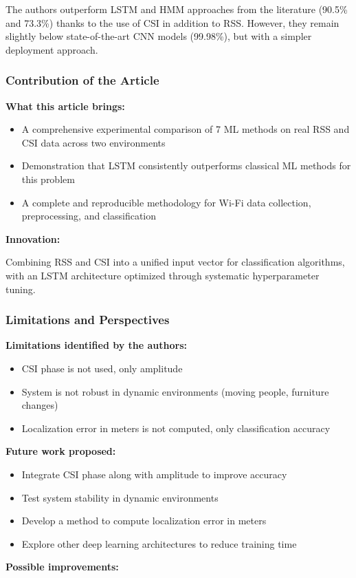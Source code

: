 \documentclass{ipgpmaster}
\begin{document}
 The authors outperform LSTM and HMM approaches from the literature (90.5\% and 73.3\%) thanks to the use of CSI in addition to RSS. However, they remain slightly below state-of-the-art CNN models (99.98\%), but with a simpler deployment approach.

\subsubsection{\textbf{Contribution of the Article}}

\textbf{What this article brings:}

\begin{itemize}
    \item A comprehensive experimental comparison of 7 ML methods on real RSS and CSI data across two environments 
    \item Demonstration that LSTM consistently outperforms classical ML methods for this problem 
    \item A complete and reproducible methodology for Wi-Fi data collection, preprocessing, and classification 
\end{itemize}
\textbf{Innovation:}

 Combining RSS and CSI into a unified input vector for classification algorithms, with an LSTM architecture optimized through systematic hyperparameter tuning.

\subsubsection{\textbf{Limitations and Perspectives}}

\textbf{Limitations identified by the authors:}

\begin{itemize}
    \item CSI phase is not used, only amplitude 
    \item System is not robust in dynamic environments (moving people, furniture changes) 
    \item Localization error in meters is not computed, only classification accuracy 
\end{itemize}
\textbf{Future work proposed:}

\begin{itemize}
    \item Integrate CSI phase along with amplitude to improve accuracy 
    \item Test system stability in dynamic environments 
    \item Develop a method to compute localization error in meters 
    \item Explore other deep learning architectures to reduce training time 

\end{itemize}
\textbf{Possible improvements:}
\end{document}
